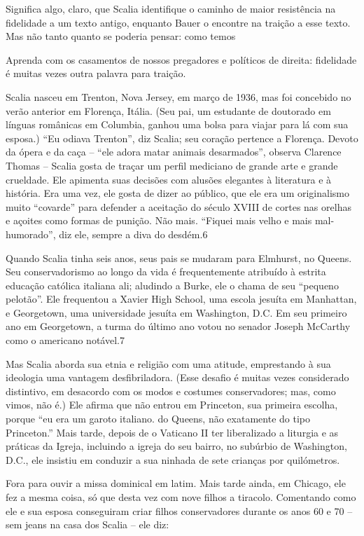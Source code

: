  \par 
Significa algo, claro, que Scalia identifique o caminho de maior resistência na fidelidade a um texto antigo, enquanto Bauer o encontre na traição a esse texto. Mas não tanto quanto se poderia pensar: como temos
 \par 
Aprenda com os casamentos de nossos pregadores e políticos de direita: fidelidade é muitas vezes outra palavra para traição.
 \par 
Scalia nasceu em Trenton, Nova Jersey, em março de 1936, mas foi concebido no verão anterior em Florença, Itália. (Seu pai, um estudante de doutorado em línguas românicas em Columbia, ganhou uma bolsa para viajar para lá com sua esposa.) “Eu odiava Trenton”, diz Scalia; seu coração pertence a Florença. Devoto da ópera e da caça – “ele adora matar animais desarmados”, observa Clarence Thomas – Scalia gosta de traçar um perfil mediciano de grande arte e grande crueldade. Ele apimenta suas decisões com alusões elegantes à literatura e à história. Era uma vez, ele gosta de dizer ao público, que ele era um originalismo muito “covarde” para defender a aceitação do século XVIII de cortes nas orelhas e açoites como formas de punição. Não mais. “Fiquei mais velho e mais mal-humorado”, diz ele, sempre a diva do desdém.{\color{blue}6}
 \par 
Quando Scalia tinha seis anos, seus pais se mudaram para Elmhurst, no Queens. Seu conservadorismo ao longo da vida é frequentemente atribuído à estrita educação católica italiana ali; aludindo a Burke, ele o chama de seu “pequeno pelotão”. Ele frequentou a Xavier High School, uma escola jesuíta em Manhattan, e Georgetown, uma universidade jesuíta em Washington, D.C. Em seu primeiro ano em Georgetown, a turma do último ano votou no senador Joseph McCarthy como o americano notável.{\color{blue}7}
 \par 
Mas Scalia aborda sua etnia e religião com uma atitude, emprestando à sua ideologia uma vantagem desfibriladora. (Esse desafio é muitas vezes considerado distintivo, em desacordo com os modos e costumes conservadores; mas, como vimos, não é.) Ele afirma que não entrou em Princeton, sua primeira escolha, porque “eu era um garoto italiano. do Queens, não exatamente do tipo Princeton.” Mais tarde, depois de o Vaticano II ter liberalizado a liturgia e as práticas da Igreja, incluindo a igreja do seu bairro, no subúrbio de Washington, D.C., ele insistiu em conduzir a sua ninhada de sete crianças por quilómetros.
 \par 
Fora para ouvir a missa dominical em latim. Mais tarde ainda, em Chicago, ele fez a mesma coisa, só que desta vez com nove filhos a tiracolo. Comentando como ele e sua esposa conseguiram criar filhos conservadores durante os anos {\color{blue}60} e {\color{blue}70} – sem jeans na casa dos Scalia – ele diz:
